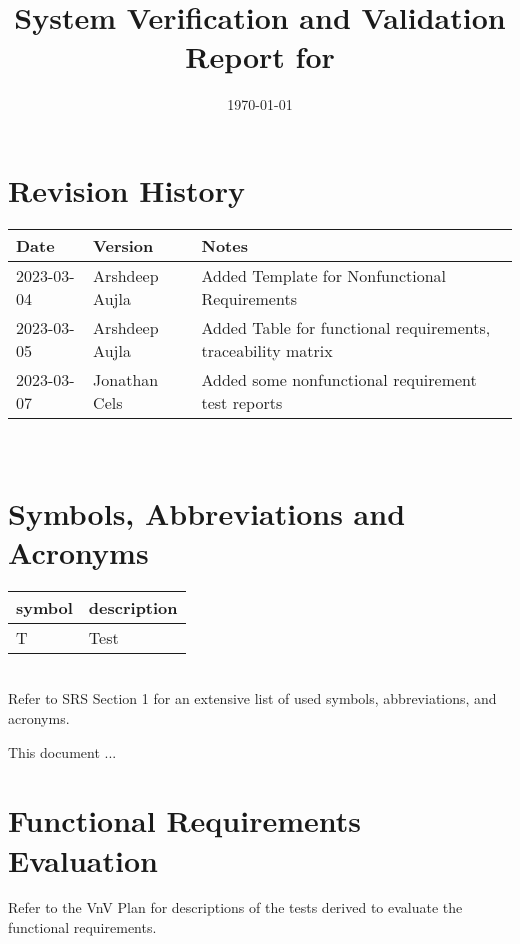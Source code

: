 \documentclass[12pt, titlepage]{article}
\begin{document}
\title{System Verification and Validation Report for \progname{}} 
\author{\authname}
\date{\today}
	
\maketitle


\section{Revision History}

\begin{tabularx}{\textwidth}{p{3cm}p{2cm}X}
\toprule {\bf Date} & {\bf Version} & {\bf Notes}\\
\midrule
2023-03-04 & Arshdeep Aujla & Added Template for Nonfunctional Requirements\\
2023-03-05 & Arshdeep Aujla & Added Table for functional requirements, traceability matrix\\
2023-03-07 & Jonathan Cels & Added some nonfunctional requirement test reports\\
\bottomrule
\end{tabularx}

~\newpage

\section{Symbols, Abbreviations and Acronyms}

\renewcommand{\arraystretch}{1.2}
\begin{tabular}{l l} 
  \toprule		
  \textbf{symbol} & \textbf{description}\\
  \midrule 
  T & Test\\
  \bottomrule
\end{tabular}\\

Refer to SRS Section 1 for an extensive list of used symbols, abbreviations, and acronyms.

\newpage

\tableofcontents

\listoftables %

\listoffigures %

\newpage


This document ...

\section{Functional Requirements Evaluation}
Refer to the VnV Plan for descriptions of the tests derived to evaluate the functional requirements.
\end{document}
